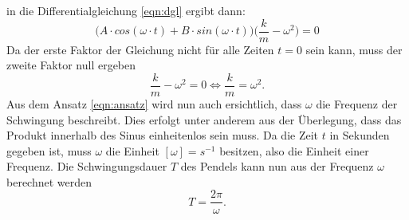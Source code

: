 in die Differentialgleichung \eqref{eqn:dgl} ergibt dann:
\begin{equation}
    \biggl(A\cdot cos(\omega\cdot t)+B\cdot sin(\omega\cdot t)\biggr)\biggl(\frac{k}{m}-\omega^2\biggr)=0
\end{equation}
Da der erste Faktor der Gleichung nicht für alle Zeiten $t=0$ sein kann, muss der zweite Faktor null ergeben
\begin{equation}
    \frac{k}{m}-\omega^2=0 \Leftrightarrow \frac{k}{m}=\omega^2 .
\end{equation}
Aus dem Ansatz \eqref{eqn:ansatz} wird nun auch ersichtlich, dass $\omega$ die Frequenz der Schwingung beschreibt. Dies erfolgt
unter anderem aus der Überlegung, dass das Produkt innerhalb des Sinus einheitenlos sein muss. Da die Zeit $t$ in Sekunden gegeben
ist, muss $\omega$ die Einheit $[\omega]=s^{-1}$ besitzen, also die Einheit einer Frequenz.
Die Schwingungsdauer $T$ des Pendels kann nun aus der Frequenz $\omega$ berechnet werden
\begin{equation}
    T=\frac{2\pi}{\omega}.
\end{equation}

